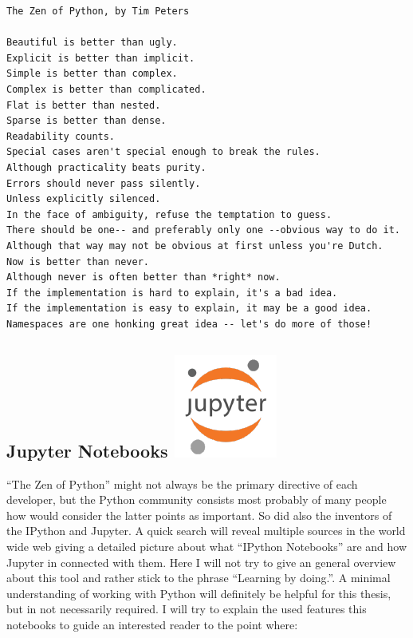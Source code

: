 \documentclass[11pt]{article}
\begin{document}
    \begin{Verbatim}[commandchars=\\\{\}]
The Zen of Python, by Tim Peters

Beautiful is better than ugly.
Explicit is better than implicit.
Simple is better than complex.
Complex is better than complicated.
Flat is better than nested.
Sparse is better than dense.
Readability counts.
Special cases aren't special enough to break the rules.
Although practicality beats purity.
Errors should never pass silently.
Unless explicitly silenced.
In the face of ambiguity, refuse the temptation to guess.
There should be one-- and preferably only one --obvious way to do it.
Although that way may not be obvious at first unless you're Dutch.
Now is better than never.
Although never is often better than *right* now.
If the implementation is hard to explain, it's a bad idea.
If the implementation is easy to explain, it may be a good idea.
Namespaces are one honking great idea -- let's do more of those!
    \end{Verbatim}

    \hypertarget{jupyter-notebooks-juypter}{%
\subsection[Jupyter Notebooks ]{\texorpdfstring{Jupyter Notebooks
\protect\includegraphics{media/icons/jupyter.png}}{Jupyter Notebooks Juypter}}\label{jupyter-notebooks-juypter}}

``The Zen of Python'' might not always be the primary directive of each
developer, but the Python community consists most probably of many
people how would consider the latter points as important. So did also
the inventors of the IPython and Jupyter. A quick search will reveal
multiple sources in the world wide web giving a detailed picture about
what ``IPython Notebooks'' are and how Jupyter in connected with them.
Here I will not try to give an general overview about this tool and
rather stick to the phrase ``Learning by doing.''. A minimal
understanding of working with Python will definitely be helpful for this
thesis, but in not necessarily required. I will try to explain the used
features this notebooks to guide an interested reader to the point
where:
\end{document}
